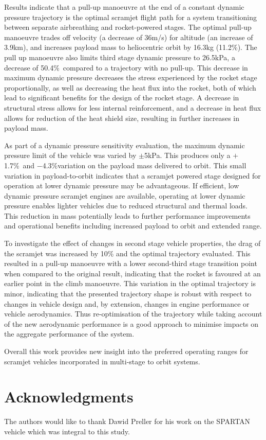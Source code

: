 \documentclass[]{aiaa-tc}
\newcommand{\PayloadImprovement}{11.2\%}
\newcommand{\qDecrease}{50.4\%}
\newcommand{\qVariationPlus}{$+$1.7\%}
\newcommand{\qVariationMinus}{$-$4.3\%}
\newcommand{\SeparationqFiftykPa}{26.5}
\begin{document}
  Results indicate that a pull-up manoeuvre at the end of a constant dynamic pressure trajectory is the optimal scramjet flight path for a system transitioning between separate airbreathing and rocket-powered stages. The optimal pull-up manoeuvre trades off velocity (a decrease of 36m/s) for altitude (an increase of 3.9km), and increases payload mass to heliocentric orbit by 16.3kg (\PayloadImprovement). The pull up manoeuvre also limits third stage dynamic pressure to \SeparationqFiftykPa kPa, a decrease of \qDecrease\ compared to a trajectory with no pull-up. This decrease in maximum dynamic pressure decreases the stress experienced by the rocket stage proportionally, as well as decreasing the heat flux into the rocket, both of which lead to significant benefits for the design of the rocket stage. A decrease in structural stress allows for less internal reinforcement, and a decrease in heat flux allows for reduction of the heat shield size, resulting in further increases in payload mass.
  

As part of a dynamic pressure sensitivity evaluation, the maximum dynamic pressure limit of the vehicle was varied by $\pm$5kPa. This produces only a \qVariationPlus\ and \qVariationMinus \space variation on the payload mass delivered to orbit. This small variation in payload-to-orbit indicates that a scramjet powered stage designed for operation at lower dynamic pressure may be advantageous.
If efficient, low dynamic pressure scramjet engines are available, operating at lower dynamic pressure enables lighter vehicles due to reduced structural and thermal loads. This reduction in mass potentially leads to further performance improvements and operational benefits including increased payload to orbit and extended range.
 
 To investigate the effect of changes in second stage vehicle properties, the drag of the scramjet was increased by 10\% and the optimal trajectory evaluated. This resulted in a pull-up manoeuvre with a lower second-third stage transition point when compared to the original result, indicating that the rocket is favoured at an earlier point in the climb manoeuvre. This variation in the optimal trajectory is minor, indicating that the presented trajectory shape is robust with respect to changes in vehicle design and, by extension, changes in engine performance or vehicle aerodynamics. Thus re-optimisation of the trajectory while taking account of the new aerodynamic performance is a good approach to minimise impacts on the aggregate performance of the system.

 Overall this work provides new insight into the preferred operating ranges for scramjet vehicles incorporated in multi-stage to orbit systems.

 


\section*{Acknowledgments}

The authors would like to thank Dawid Preller for his work on the SPARTAN vehicle which was integral to this study.

\footnotesize



\end{document}
